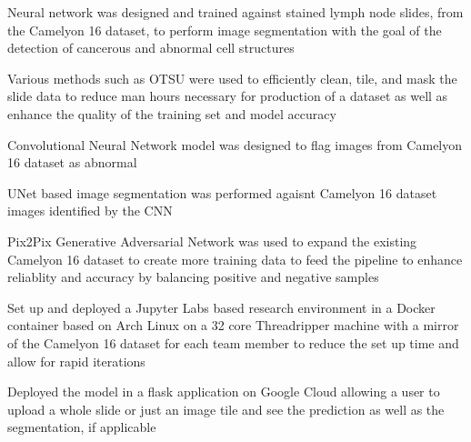 \documentclass[letterpaper]{resume}
\begin{document}
\begin{compactitem}
\item Neural network was designed and trained against stained lymph node slides, from the Camelyon 16 dataset, to perform image segmentation with the goal of the detection of cancerous and abnormal cell structures
\item Various methods such as OTSU were used to efficiently clean, tile, and mask the slide data to reduce man hours necessary for production of a dataset as well as enhance the quality of the training set and model accuracy
\item Convolutional Neural Network model was designed to flag images from Camelyon 16 dataset as abnormal
\item UNet based image segmentation was performed agaisnt Camelyon 16 dataset images identified by the CNN
\item Pix2Pix Generative Adversarial Network was used to expand the existing Camelyon 16 dataset to create more training data to feed the pipeline to enhance reliablity and accuracy by balancing positive and negative samples
\item Set up and deployed a Jupyter Labs based research environment in a Docker container based on Arch Linux on a 32 core Threadripper machine with a mirror of the Camelyon 16 dataset for each team member to reduce the set up time and allow for rapid iterations
\item Deployed the model in a flask application on Google Cloud allowing a user to upload a whole slide or just an image tile and see the prediction as well as the segmentation, if applicable
\end{compactitem}
\end{document}
